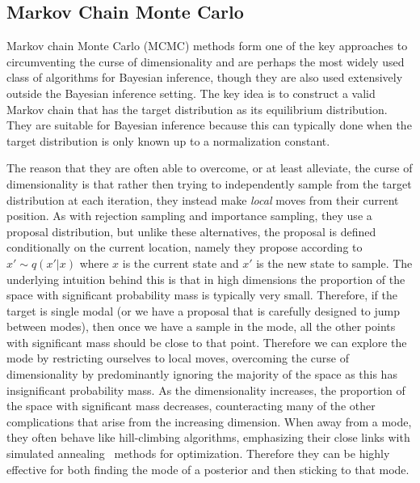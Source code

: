 
\subsection{Markov Chain Monte Carlo}
\label{sec:inf:foundation:mcmc}


Markov chain Monte Carlo (MCMC) methods \cite{metropolis1953equation,hastings1970monte,gilks1995markov} 
form one of the key approaches to circumventing the curse of dimensionality
and are perhaps the most widely used class of algorithms for Bayesian inference, though they
are also used extensively outside the Bayesian inference setting.  The key idea is to construct
a valid Markov chain that has the target distribution as its equilibrium distribution.  They are suitable
for Bayesian inference because this can typically done when the target distribution is only known
up to a normalization constant.  

The reason that they are often able to overcome, or at least alleviate,
the curse of dimensionality is that rather then trying to independently sample from the target distribution
at each iteration, they instead make \emph{local} moves from their current position.  As with
rejection sampling and importance sampling, they use a proposal distribution, but unlike these
alternatives, the proposal is defined conditionally on the current location, namely they propose
according to $x' \sim q(x' | x)$ where $x$ is the current state and $x'$ is the new
state to sample.  The underlying intuition behind this is that in high dimensions the proportion of the
space with significant probability mass is typically very small.  Therefore, if the target is single modal (or
we have a proposal that is carefully designed to jump between modes), then once we have a sample
in the mode, all the other points with significant mass should be close to that point.  Therefore we can
explore the mode by restricting ourselves to local moves, overcoming the curse of dimensionality by
predominantly ignoring the majority of the space as this has insignificant probability mass.  As the
dimensionality increases, the proportion of the space with significant mass decreases, counteracting
many of the other complications that arise from the increasing dimension.  When away from a mode,
they often behave like hill-climbing algorithms, emphasizing their close links with simulated annealing~\citep{aarts1988simulated}
methods for optimization.  Therefore they can be highly effective for both finding the mode
of a posterior and then sticking to that mode.

